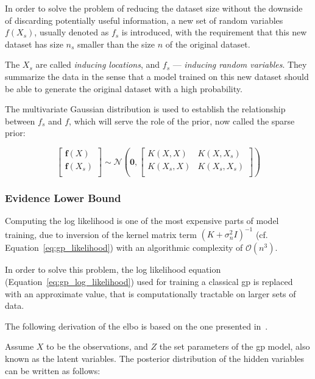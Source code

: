 In order to solve the problem of reducing the dataset size without the downside
of discarding potentially useful information, a new set of random variables
$f(X_s)$, usually denoted as $f_s$ is introduced, with the requirement that this
new dataset has size $n_s$  smaller than the size $n$ of the original dataset. 

The $X_s$ are called \textit{inducing locations}, and $f_s$ --- \textit{inducing
random variables}. They summarize the data in the sense that a model trained on
this new dataset should be able to generate the original dataset with a high
probability.

The multivariate Gaussian distribution is used to establish the relationship
between $f_s$ and $f$, which will serve the role of the prior, now called the
sparse prior:

\begin{equation}
    \begin{bmatrix}
        \mathbf{f}(X) \\
        \mathbf{f}(X_s) \\
    \end{bmatrix} \sim
    \mathcal{N}\left(
        \mathbf{0}, 
        \begin{bmatrix}
            K(X, X) & K(X, X_s) \\
            K(X_s, X) & K(X_s, X_s) \\
        \end{bmatrix}
    \right)
\end{equation}

\subsubsection{Evidence Lower Bound}\label{sec:elbo}

Computing the log likelihood is one of the most expensive parts of model
training, due to inversion of the kernel matrix term ${\left(K +
\sigma_n^2I\right)}^{-1}$ (cf. Equation~\ref{eq:gp_likelihood}) with an
algorithmic complexity of $\mathcal{O}(n^3)$.

In order to solve this problem, the log likelihood equation
(Equation~\ref{eq:gp_log_likelihood}) used for training a
classical \acrshort{gp} is replaced with an approximate value, that is
computationally tractable on larger sets of data.

The following derivation of the \acrfull{elbo} is based on the one presented
in~\cite{yangUnderstandingVariationalLower}.

Assume $X$ to be the observations, and $Z$ the set parameters of the
\acrshort{gp} model, also known as the latent variables. The posterior
distribution of the hidden variables can be written as follows:

